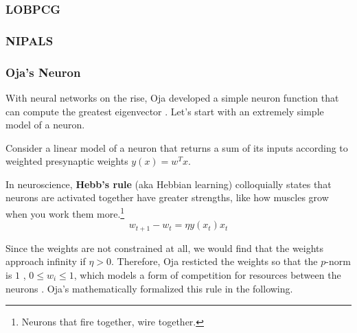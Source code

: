 \subsubsection{LOBPCG}

\subsubsection{NIPALS}

\subsubsection{Oja's Neuron}

  With neural networks on the rise, Oja developed a simple neuron function that can compute the greatest eigenvector \cite{1982oja}. Let's start with an extremely simple model of a neuron. 

  \begin{definition}[Neuron]
    \label{def:neuron}
    Consider a linear model of a neuron that returns a sum of its inputs according to weighted presynaptic weights $y(x) = w^T x$. 
  \end{definition} 

  \begin{definition}
    \label{def:hebbs-rule}
    In neuroscience, \textbf{Hebb's rule} (aka Hebbian learning) colloquially states that neurons are activated together have greater strengths, like how muscles grow when you work them more.\footnote{Neurons that fire together, wire together.}  
    \begin{equation}
      w_{t+1} - w_t = \eta y(x_t) x_t
    \end{equation}
  \end{definition}

  Since the weights are not constrained at all, we would find that the weights approach infinity if $\eta > 0$. Therefore, Oja resticted the weights so that the $p$-norm is $1$ , $0 \leq w_i \leq 1$, which models a form of competition for resources between the neurons \cite{1982oja}. Oja's mathematically formalized this rule in the following. 

